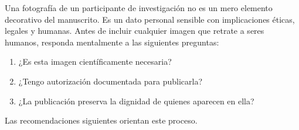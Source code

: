 \documentclass[spanish]{rbie2026}%
\begin{document}
Una fotografía de un participante de investigación no es un mero elemento decorativo del manuscrito. Es un dato personal sensible con implicaciones éticas, legales y humanas. Antes de incluir cualquier imagen que retrate a seres humanos, responda mentalmente a las siguientes preguntas:

\begin{enumerate}
  \item ¿Es esta imagen científicamente necesaria?

  \item ¿Tengo autorización documentada para publicarla?

  \item ¿La publicación preserva la dignidad de quienes aparecen en ella?
\end{enumerate}

Las recomendaciones siguientes orientan este proceso.
\end{document}
